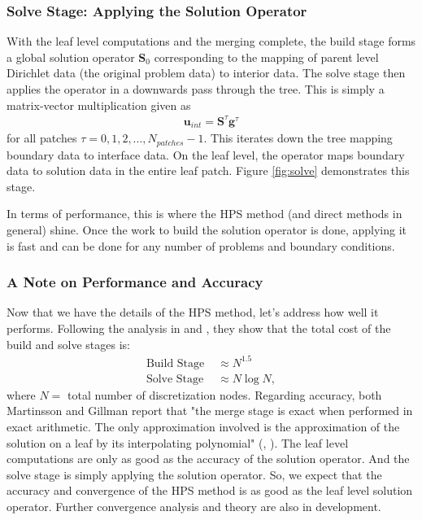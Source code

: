 \subsubsection{Solve Stage: Applying the Solution Operator}

With the leaf level computations and the merging complete, the build stage forms a global solution operator $\textbf{S}_0$ corresponding to the mapping of parent level Dirichlet data (the original problem data) to interior data. The solve stage then applies the operator in a downwards pass through the tree. This is simply a matrix-vector multiplication given as
\begin{align}
    \textbf{u}_{int} = \textbf{S}^{\tau} \textbf{g}^{\tau}
\end{align}
for all patches $\tau = 0, 1, 2, ..., N_{patches} - 1$. This iterates down the tree mapping boundary data to interface data. On the leaf level, the operator maps boundary data to solution data in the entire leaf patch. Figure \ref{fig:solve} demonstrates this stage.

In terms of performance, this is where the HPS method (and direct methods in general) shine. Once the work to build the solution operator is done, applying it is fast and can be done for any number of problems and boundary conditions.

\subsubsection{A Note on Performance and Accuracy}

Now that we have the details of the HPS method, let's address how well it performs. Following the analysis in \citep{martinsson2015hierarchical} and \citep{gillman2014direct}, they show that the total cost of the build and solve stages is:
\begin{align}
    \text{Build Stage }& \approx N^{1.5} \\
    \text{Solve Stage }& \approx N \log N,
\end{align}
where $N = $ total number of discretization nodes. Regarding accuracy, both Martinsson and Gillman report that "the merge stage is exact when performed in exact arithmetic. The only approximation involved is the approximation of the solution on a leaf by its interpolating polynomial" (\citep{martinsson2015hierarchical}, \citep{gillman2014direct}). The leaf level computations are only as good as the accuracy of the solution operator. And the solve stage is simply applying the solution operator. So, we expect that the accuracy and convergence of the HPS method is as good as the leaf level solution operator. Further convergence analysis and theory are also in development.

